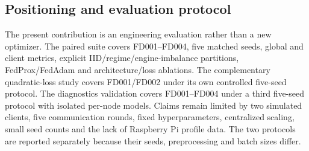 \subsection{Positioning and evaluation protocol}
The present contribution is an engineering evaluation rather than a new optimizer. The paired suite covers FD001--FD004, five matched seeds, global and client metrics, explicit IID/regime/engine-imbalance partitions, FedProx/FedAdam and architecture/loss ablations. The complementary quadratic-loss study covers FD001/FD002 under its own controlled five-seed protocol. The diagnostics validation covers FD001--FD004 under a third five-seed protocol with isolated per-node models. Claims remain limited by two simulated clients, five communication rounds, fixed hyperparameters, centralized scaling, small seed counts and the lack of Raspberry Pi profile data. The two protocols are reported separately because their seeds, preprocessing and batch sizes differ.
